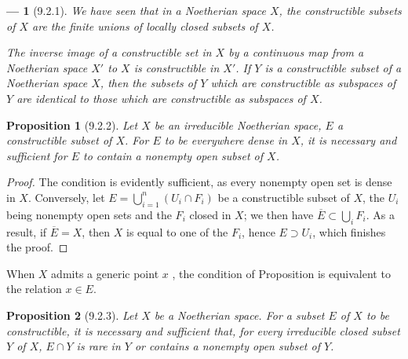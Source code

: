 \documentclass[oneside]{amsart}
\theoremstyle{ega-env-style}
\newtheorem*{env}{---}
\theoremstyle{ega-thm-env-style}
\newtheorem*{proposition}{Proposition}
\theoremstyle{ega-defn-env-style}
\newcommand{\oldpage}[2][]{{\marginnote{\normalfont{\textbf{#1}~|~#2}}}\ignorespaces}
\let\EGAOriginalLabel\label
\renewcommand{\label}[1]{\phantomsection\EGAOriginalLabel{#1}}
\begin{document}
\begin{env}[9.2.1]
\label{0.9.2.1}
We have seen  that in a Noetherian space $X$, the constructible subsets of $X$ are the \emph{finite unions of locally closed subsets of $X$}.

The inverse image of a constructible set in $X$ by a continuous map from a Noetherian space $X'$ to $X$ is constructible in $X'$.
If $Y$ is a constructible subset of a Noetherian space $X$, then the subsets of $Y$ which are constructible as subspaces of $Y$ are identical to those which are constructible as subspaces of $X$.
\end{env}

\begin{proposition}[9.2.2]
\label{0.9.2.2}
Let $X$ be an irreducible Noetherian space, $E$ a constructible subset of $X$.
For $E$ to be everywhere dense in $X$, it is necessary and sufficient for $E$ to contain a nonempty open subset of $X$.
\end{proposition}

\begin{proof}
\oldpage[0\textsubscript{III}]{15}
The condition is evidently sufficient, as every nonempty open set is dense in $X$.
Conversely, let $E=\bigcup_{i=1}^n(U_i\cap F_i)$ be a constructible subset of $X$, the $U_i$ being nonempty open sets and the $F_i$ closed in $X$; we then have $\overline{E}\subset\bigcup_i F_i$.
As a result, if $\overline{E}=X$, then $X$ is equal to one of the $F_i$, hence $E\supset U_i$, which finishes the proof.
\end{proof}

When $X$ admits a generic point $x$ , the condition of Proposition  is equivalent to the relation $x\in E$.

\begin{proposition}[9.2.3]
\label{0.9.2.3}
Let $X$ be a Noetherian space.
For a subset $E$ of $X$ to be constructible, it is necessary and sufficient that, for every irreducible closed subset $Y$ of $X$, $E\cap Y$ is rare in $Y$ or contains a nonempty open subset of $Y$.
\end{proposition}
\end{document}
